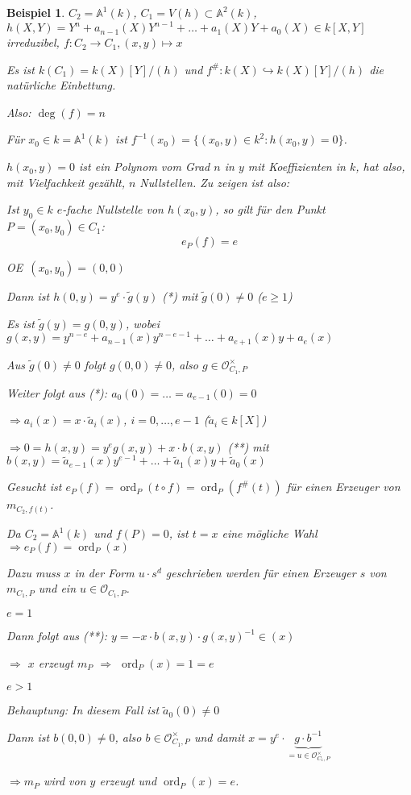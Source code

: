 \documentclass[a4paper, 12pt, numbers=noendperiod, chapterprefix=true]{scrbook}
\theoremstyle{break}
\theoremstyle{nonumberbreak}
\newtheorem{nnBsp}{Beispiel}
\theoremstyle{nonumberplain}
\DeclareMathOperator{\ord}{ord}
\newcommand{\A}{\mathbb{A}}
\newcommand{\calO}{\mathcal{O}}
\newcommand{\X}{\times}
\renewcommand{\OE}{O\!\!E~}
\begin{document}
\begin{nnBsp}
$C_2=\A^1(k)$, $C_1=V(h)\subset \A^2(k)$, $h(X,Y)=Y^n+a_{n-1}(X)Y^{n-1}+\ldots +a_1(X)Y+a_0(X) \in k[X,Y]$ irreduzibel, $f:C_2 \to C_1, (x,y) \mapsto x$

Es ist $k(C_1) = k(X)[Y]/(h)$ und $f^\#: k(X) \hookrightarrow k(X)[Y]/(h)$ die nat\"urliche Einbettung.

Also: $\deg(f) = n$

F\"ur $x_0 \in k =\A^1(k)$ ist $f^{-1}(x_0) = \{ (x_0,y) \in k^2: h(x_0,y)=0\}$.

$h(x_0,y)=0$ ist ein Polynom vom Grad $n$ in $y$ mit Koeffizienten in $k$, hat also, mit Vielfachkeit gez\"ahlt, $n$ Nullstellen. Zu zeigen ist also:
\begin{description}[\setlabelstyle{\itshape}]
\item[Behauptung:]
	Ist $y_0 \in k$ $e$-fache Nullstelle von $h(x_0,y)$, so gilt f\"ur den Punkt $P = (x_0,y_0) \in C_1$: \[e_P(f)=e\]
\item[Beweis:]
	\OE $(x_0, y_0) = (0,0)$
	
	Dann ist $h(0,y) = y^e\cdot \tilde{g}(y)$ (*) mit $\tilde{g}(0) \ne 0$ ($e \ge 1$)
	
	Es ist $\tilde{g}(y) = g(0,y)$, wobei $g(x,y) = y^{n-e} + a_{n-1}(x)y^{n-e-1} + \ldots + a_{e+1}(x)y + a_e(x)$
	
	Aus $\tilde{g}(0) \ne 0$ folgt $g(0,0) \ne 0$, also $g \in \calO_{C_1, P}^\X$
	
	Weiter folgt aus (*): $a_0(0) = \ldots = a_{e-1}(0) = 0$
	
	$\Rightarrow a_i(x) = x \cdot \tilde{a}_i(x)$, $i=0,\ldots ,e-1$ ($\tilde{a}_i \in k[X]$)
	
	$\Rightarrow 0=h(x,y) = y^e g(x,y) + x \cdot b(x,y)$ (**) mit $b(x,y) = \tilde{a}_{e-1}(x)y^{e-1} + \ldots  + \tilde{a}_1(x)y + \tilde{a}_0(x)$
	
	Gesucht ist $e_P(f) = \ord_P(t \circ f) = \ord_P(f^\#(t))$ f\"ur einen Erzeuger von $m_{C_2,f(t)}$.
	
	Da $C_2 = \A^1(k)$ und $f(P) = 0$, ist $t=x$ eine m\"ogliche Wahl $\Rightarrow e_P(f) = \ord_P(x)$
	
	Dazu muss $x$ in der Form $u\cdot s^d$ geschrieben werden f\"ur einen Erzeuger $s$ von $m_{C_1,P}$ und ein $u \in \calO_{C_1,P}$.
	\begin{description}[\setlabelstyle{\itshape}]
		\item[1. Fall:] $e=1$
		
			Dann folgt aus (**):	$y = -x \cdot b(x,y) \cdot g(x,y)^{-1} \in (x)$
			
			$\Rightarrow$ $x$ erzeugt $m_P$ $\Rightarrow$ $\ord_P(x) = 1 = e$
		\item[2. Fall:] $e > 1$
		
			\emph{Behauptung:} In diesem Fall ist $\tilde{a}_0(0) \ne 0$
			
			Dann ist $b(0,0) \ne 0$, also $b \in \calO_{C_1,P}^\X$ und damit $x= y^e \cdot \underbrace{g \cdot b^{-1}}_{=u \in \calO_{C_1,P}^\X}$
			
			$\Rightarrow m_P$ wird von $y$ erzeugt und $\ord_P(x) = e$.
	\end{description}
\end{description}\end{nnBsp}
\end{document}
